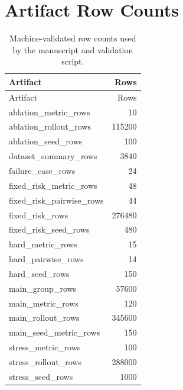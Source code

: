 \documentclass{article}
\begin{document}
\section{Artifact Row Counts}
\begin{longtable}{@{}lr@{}}
\caption{Machine-validated row counts used by the manuscript and validation script.}\\
\toprule
Artifact & Rows\\
\midrule
\endfirsthead
\toprule
Artifact & Rows\\
\midrule
\endhead
ablation\_metric\_rows & 10 \\
ablation\_rollout\_rows & 115200 \\
ablation\_seed\_rows & 100 \\
dataset\_summary\_rows & 3840 \\
failure\_case\_rows & 24 \\
fixed\_risk\_metric\_rows & 48 \\
fixed\_risk\_pairwise\_rows & 44 \\
fixed\_risk\_rows & 276480 \\
fixed\_risk\_seed\_rows & 480 \\
hard\_metric\_rows & 15 \\
hard\_pairwise\_rows & 14 \\
hard\_seed\_rows & 150 \\
main\_group\_rows & 57600 \\
main\_metric\_rows & 120 \\
main\_rollout\_rows & 345600 \\
main\_seed\_metric\_rows & 150 \\
stress\_metric\_rows & 100 \\
stress\_rollout\_rows & 288000 \\
stress\_seed\_rows & 1000 \\
\bottomrule
\end{longtable}
\end{document}
